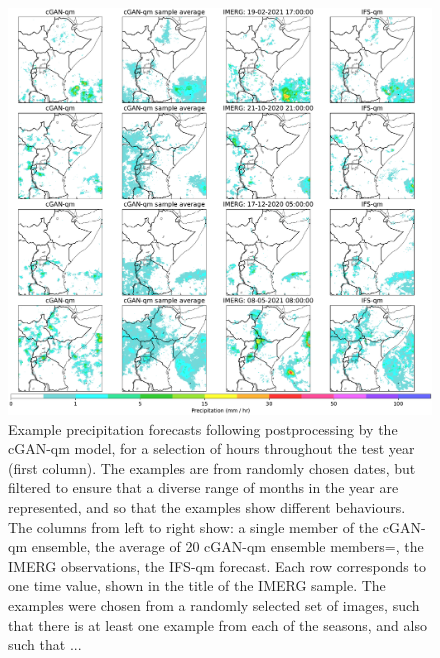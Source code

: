 \documentclass{article}
\begin{document}
\begin{figure}
     \centering
     \includegraphics[width=1.05\textwidth]{images/cGAN_samples_IFS_final-nologs_217600.pdf}
     
     \caption{Example precipitation forecasts following postprocessing by the cGAN-qm model, for a selection of hours throughout the test year (first column). The examples are from randomly chosen dates, but filtered to ensure that a diverse range of months in the year are represented, and so that the examples show different behaviours. The columns from left to right show: a single member of the cGAN-qm ensemble, the average of 20 cGAN-qm ensemble members=, the IMERG observations, the IFS-qm forecast. Each row corresponds to one time value, shown in the title of the IMERG sample. The examples were chosen from a randomly selected set of images, such that there is at least one example from each of the seasons, and also such that ...  }
     \label{fig:examples}
\end{figure}
\end{document}
